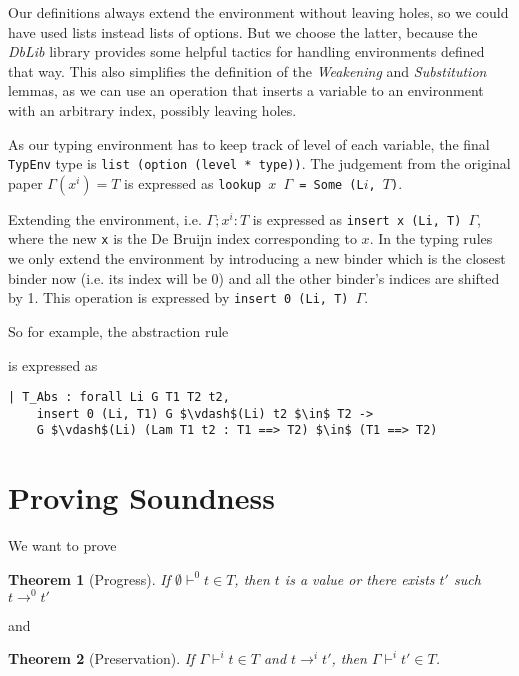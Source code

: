 \documentclass[runningheads]{article}
\newcommand{\tpd}[2]{{#1}{:}{#2}}
\newcommand{\lam}[3]{\lambda#1{:}#2.#3}
\newtheorem*{theorem}{Theorem}
\begin{document}
Our definitions always extend the environment without leaving holes, so we could have used lists instead lists of options. But we choose the latter, because the \textit{DbLib} library provides some helpful tactics for handling environments defined that way. This also simplifies the definition of the \textit{Weakening} and \textit{Substitution} lemmas, as we can use an operation that inserts a variable to an environment with an arbitrary index, possibly leaving holes.

As our typing environment has to keep track of level of each variable, the final \texttt{TypEnv} type is \texttt{list (option (level * type))}. The judgement from the original paper $\Gamma(x^i) = T$ is expressed as \texttt{lookup $x$ $\Gamma$ = Some (L$i$, $T$)}.

Extending the environment, i.e. $\Gamma; x^i : T$ is expressed as \verb|insert x (Li, T) |$\Gamma$, where the new \verb|x| is the De Bruijn index corresponding to $x$. In the typing rules we only extend the environment by introducing a new binder which is the closest binder now (i.e. its index will be 0) and all the other binder's indices are shifted by 1. This operation is expressed by \verb|insert 0 (Li, T) |$\Gamma$.

So for example, the abstraction rule
\begin{framed}
\infrule{ \Gamma,x^i{:}T_1 \vdash^i t_2 \in T_2 }{\Gamma \vdash^i \tpd{(\lam{x}{T_1}{t_2})}{T_1{\to}T_2} \; \in \; T_1 \to T_2}
\end{framed}
is expressed as
\begin{lstlisting}[mathescape=true]
| T_Abs : forall Li G T1 T2 t2,
    insert 0 (Li, T1) G $\vdash$(Li) t2 $\in$ T2 ->
    G $\vdash$(Li) (Lam T1 t2 : T1 ==> T2) $\in$ (T1 ==> T2)
\end{lstlisting}



\section{Proving Soundness}
\label{sec:proving}
We want to prove
\begin{theorem}[Progress]
 If $\emptyset \vdash^0 t \in T$, then $t$ is a value or there exists $t'$ such $t \longrightarrow^0 t'$ 
\end{theorem}
and
\begin{theorem}[Preservation]
If $\Gamma \vdash^i t \in T$ and $t \longrightarrow^i t'$, then $\Gamma \vdash^i t' \in T$.
\end{theorem}
\end{document}
